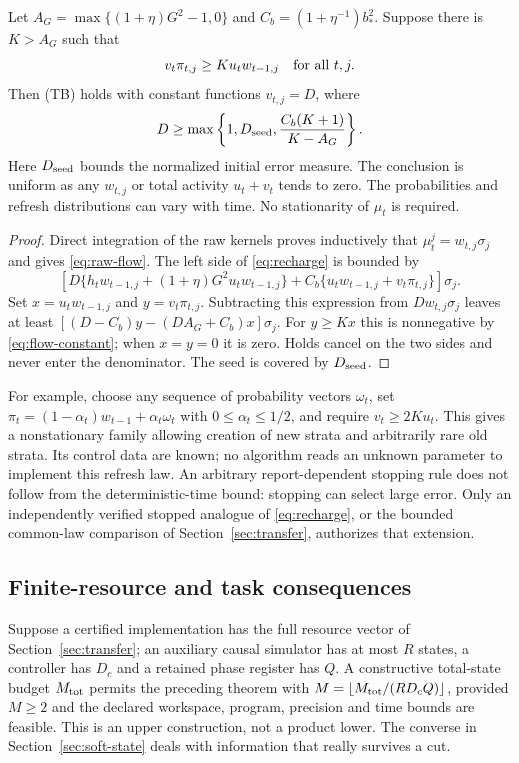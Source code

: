 \begin{proposition}\label{prop:recharge-flow}
Let $A_G=\max\{(1+\eta)G^2-1,0\}$ and $C_b=(1+\eta^{-1})b_*^2$. Suppose there is $K>A_G$ such that
\begin{equation}\label{eq:flow-balance}
 v_t\pi_{t,j}\ge K u_t w_{t-1,j}\quad\hbox{for all }t,j.
\end{equation}
Then \textup{(TB)} holds with constant functions $v_{t,j}=D$, where
\begin{equation}\label{eq:flow-constant}
 D\ge\max\left\{1,D_{\rm seed},\frac{C_b(K+1)}{K-A_G}\right\}.
\end{equation}
Here $D_{\rm seed}$ bounds the normalized initial error measure. The conclusion is uniform as any $w_{t,j}$ or total activity $u_t+v_t$ tends to zero. The probabilities and refresh distributions can vary with time. No stationarity of $\mu_t$ is required.
\end{proposition}
\begin{proof}
Direct integration of the raw kernels proves inductively that $\mu_t^j=w_{t,j}\sigma_j$ and gives \eqref{eq:raw-flow}. The left side of \eqref{eq:recharge} is bounded by
\[
 \left[D\{h_tw_{t-1,j}+(1+\eta)G^2u_tw_{t-1,j}\}
       +C_b\{u_tw_{t-1,j}+v_t\pi_{t,j}\}\right]\sigma_j.
\]
Set $x=u_tw_{t-1,j}$ and $y=v_t\pi_{t,j}$. Subtracting this expression from $D w_{t,j}\sigma_j$ leaves at least
$[(D-C_b)y-(D A_G+C_b)x]\sigma_j$.
For $y\ge Kx$ this is nonnegative by \eqref{eq:flow-constant}; when $x=y=0$ it is zero. Holds cancel on the two sides and never enter the denominator. The seed is covered by $D_{\rm seed}$.
\end{proof}

For example, choose any sequence of probability vectors $\omega_t$, set
$\pi_t=(1-\alpha_t)w_{t-1}+\alpha_t\omega_t$ with $0\le\alpha_t\le1/2$, and require $v_t\ge2K u_t$. This gives a nonstationary family allowing creation of new strata and arbitrarily rare old strata. Its control data are known; no algorithm reads an unknown parameter to implement this refresh law. An arbitrary report-dependent stopping rule does not follow from the deterministic-time bound: stopping can select large error. Only an independently verified stopped analogue of \eqref{eq:recharge}, or the bounded common-law comparison of Section~\ref{sec:transfer}, authorizes that extension.

\subsection{Finite-resource and task consequences}
Suppose a certified implementation has the full resource vector of Section~\ref{sec:transfer}; an auxiliary causal simulator has at most $R$ states, a controller has $D_c$ and a retained phase register has $Q$. A constructive total-state budget $M_{\rm tot}$ permits the preceding theorem with $M=\lfloor M_{\rm tot}/(RD_cQ)\rfloor$, provided $M\ge2$ and the declared workspace, program, precision and time bounds are feasible. This is an upper construction, not a product lower. The converse in Section~\ref{sec:soft-state} deals with information that really survives a cut.

